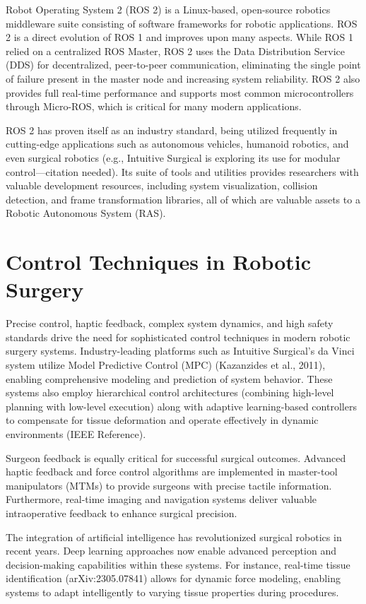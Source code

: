 Robot Operating System 2 (ROS 2) is a Linux-based, open-source robotics middleware suite consisting of software frameworks for robotic applications. ROS 2 is a direct evolution of ROS 1 and improves upon many aspects. While ROS 1 relied on a centralized ROS Master, ROS 2 uses the Data Distribution Service (DDS) for decentralized, peer-to-peer communication, eliminating the single point of failure present in the master node and increasing system reliability. ROS 2 also provides full real-time performance and supports most common microcontrollers through Micro-ROS, which is critical for many modern applications.

ROS 2 has proven itself as an industry standard, being utilized frequently in cutting-edge applications such as autonomous vehicles, humanoid robotics, and even surgical robotics (e.g., Intuitive Surgical is exploring its use for modular control—citation needed). Its suite of tools and utilities provides researchers with valuable development resources, including system visualization, collision detection, and frame transformation libraries, all of which are valuable assets to a Robotic Autonomous System (RAS).

\section{Control Techniques in Robotic Surgery}

Precise control, haptic feedback, complex system dynamics, and high safety standards drive the need for sophisticated control techniques in modern robotic surgery systems. Industry-leading platforms such as Intuitive Surgical's da Vinci system utilize Model Predictive Control (MPC) (Kazanzides et al., 2011), enabling comprehensive modeling and prediction of system behavior. These systems also employ hierarchical control architectures (combining high-level planning with low-level execution) along with adaptive learning-based controllers to compensate for tissue deformation and operate effectively in dynamic environments (IEEE Reference).

Surgeon feedback is equally critical for successful surgical outcomes. Advanced haptic feedback and force control algorithms are implemented in master-tool manipulators (MTMs) to provide surgeons with precise tactile information. Furthermore, real-time imaging and navigation systems deliver valuable intraoperative feedback to enhance surgical precision.

The integration of artificial intelligence has revolutionized surgical robotics in recent years. Deep learning approaches now enable advanced perception and decision-making capabilities within these systems. For instance, real-time tissue identification (arXiv:2305.07841) allows for dynamic force modeling, enabling systems to adapt intelligently to varying tissue properties during procedures.

